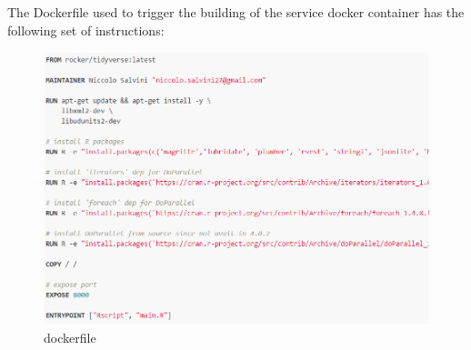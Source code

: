\documentclass[
  12pt,
  a4paper,
  oneside]{book}
\theoremstyle{definition}
\theoremstyle{definition}
\theoremstyle{definition}
\theoremstyle{remark}
\begin{document}
The Dockerfile used to trigger the building of the service docker container has the following set of instructions:

\begin{figure}
\centering
\includegraphics{images/dockerfile.PNG}
\caption{dockerfile}
\end{figure}
\end{document}
